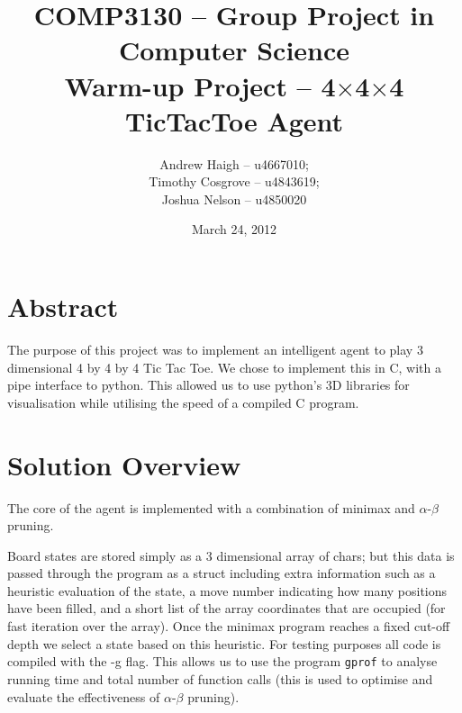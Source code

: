 \documentclass[10pt,twocolumn]{article}
\title{COMP3130 -- Group Project in Computer Science\\ Warm-up Project -- 4$\times$4$\times$4 TicTacToe Agent}
\date{March 24, 2012}
\author{Andrew Haigh -- u4667010;\\ Timothy Cosgrove -- u4843619;\\ Joshua Nelson -- u4850020}
\begin{document}
\onecolumn
\maketitle
\twocolumn
\section{Abstract}
The purpose of this project was to implement an intelligent agent to play 3
dimensional 4 by 4 by 4 Tic Tac Toe. We chose to implement this in C, with a
pipe interface to python. This allowed us to use python's 3D libraries for visualisation
while utilising the speed of a compiled C program.

\section{Solution Overview}
The core of the agent is implemented with a combination of minimax and $\alpha$-$\beta$ pruning.

Board states are stored simply as a 3 dimensional array of chars; but this data is passed
through the program as a struct including extra information such as a heuristic evaluation
of the state, a move number indicating how many positions have been filled,
and a short list of the array coordinates that are occupied (for fast iteration over the array).
Once the minimax program reaches a fixed cut-off depth we select a state based on
this heuristic. For testing purposes all code is compiled with the -g flag. This allows
us to use the program \texttt{gprof} to analyse running time and total number of function calls
(this is used to optimise and evaluate the effectiveness of $\alpha$-$\beta$ pruning).
\end{document}
